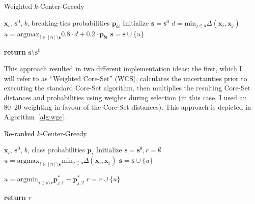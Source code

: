 \documentclass[english,bachelor,ul]{webisthesis} %
\begin{document}
\begin{algorithm}[htpb]
\caption{Weighted $k$-Center-Greedy}%
\label{alg:wgc}
\begin{algorithmic}

\Require $ \mathbf{x}_i $, $ \mathbf{s}^0 $, $ b $, breaking-ties probabilities $ \mathbf{p}_{bt} $
\State Initialize $ \mathbf{s} = \mathbf{s}^0 $
\Repeat
\State $ d = \text{min}_{j \in \mathbf{s}} \Delta(\mathbf{x}_i, \mathbf{x}_j) $ 
    \State $ u = \text{argmax}_{i \in [n] \setminus \mathbf{s}} 0.8 \cdot d + 0.2 \cdot \mathbf{p}_{bt} $
\State $ \mathbf{s} = \mathbf{s} \cup \{u\} $

\State \textbf{return} $\mathbf{s} \setminus \mathbf{s}^0 $
\end{algorithmic}
\end{algorithm}

This approach resulted in two different implementation ideas: the first, which I will refer to as ``Weighted Core-Set'' (WCS), calculates the uncertainties prior to executing the standard Core-Set algorithm, then multiplies the resulting Core-Set distances and probabilities using weights during selection (in this case, I used an 80--20 weighting in favour of the Core-Set distances). This approach is depicted in Algorithm~\ref{alg:wgc}.

\begin{algorithm}[htpb]
\caption{Re-ranked $k$-Center-Greedy}%
\label{alg:rwgc}
\begin{algorithmic}

\Require $ \mathbf{x}_i $, $ \mathbf{s}^0 $, $ b $, class probabilities $ \mathbf{p}_i $
\State Initialize $ \mathbf{s} = \mathbf{s}^0, r = \emptyset $
\Repeat
\State $ u = \text{argmax}_{i \in [n] \setminus \mathbf{s}} \text{min}_{j \in \mathbf{s}} \Delta(\mathbf{x}_i, \mathbf{x}_j) $
\State $ \mathbf{s} = \mathbf{s} \cup \{u\} $



\Repeat
\State $ u = \text{argmin}_{j \in \mathbf{s} \setminus r}\mathbf{p}_{j, 1}^* - \mathbf{p}_{j, 2}^* $
\State $ r = r \cup \{u\} $

\State \textbf{return} $ r $
\end{algorithmic}
\end{algorithm}
\end{document}
